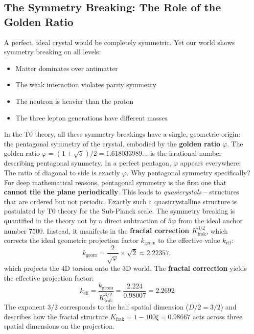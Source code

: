 	\subsection{The Symmetry Breaking: The Role of the Golden Ratio}
	A perfect, ideal crystal would be completely symmetric. Yet our world shows symmetry breaking on all levels:
	\begin{itemize}
		\item Matter dominates over antimatter
		\item The weak interaction violates parity symmetry
		\item The neutron is heavier than the proton
		\item The three lepton generations have different masses
	\end{itemize}
	In the T0 theory, all these symmetry breakings have a single, geometric origin: the pentagonal symmetry of the crystal, embodied by the \textbf{golden ratio} \(\varphi\).
	The golden ratio \(\varphi = (1+\sqrt{5})/2 = 1.618033989\ldots\) is the irrational number describing pentagonal symmetry. In a perfect pentagon, \(\varphi\) appears everywhere: The ratio of diagonal to side is exactly \(\varphi\).
	Why pentagonal symmetry specifically? For deep mathematical reasons, pentagonal symmetry is the first one that \textbf{cannot tile the plane periodically}. This leads to \emph{quasicrystals} – structures that are ordered but not periodic. Exactly such a quasicrystalline structure is postulated by T0 theory for the Sub-Planck scale.
	The symmetry breaking is quantified in the theory not by a direct subtraction of \(5\varphi\) from the ideal anchor number 7500. Instead, it manifests in the \textbf{fractal correction $K_\text{frak}^{3/2}$}, which corrects the ideal geometric projection factor \(k_\text{geom}\) to the effective value \(k_\text{eff}\):
	\begin{equation}
		k_\text{geom} = \frac{2}{\sqrt{\varphi}} \times \sqrt{2} \approx 2.22357,
	\end{equation}
	which projects the 4D torsion onto the 3D world. The \textbf{fractal correction} yields the effective projection factor:
	\begin{equation}
		k_\text{eff} = \frac{k_\text{geom}}{K_\text{frak}^{3/2}} = \frac{2.224}{0.98007} = 2.2692
	\end{equation}
	The exponent $3/2$ corresponds to the half spatial dimension ($D/2 = 3/2$) and describes how the fractal structure $K_\text{frak} = 1 - 100\xi = 0.98667$ acts across three spatial dimensions on the projection.
	
